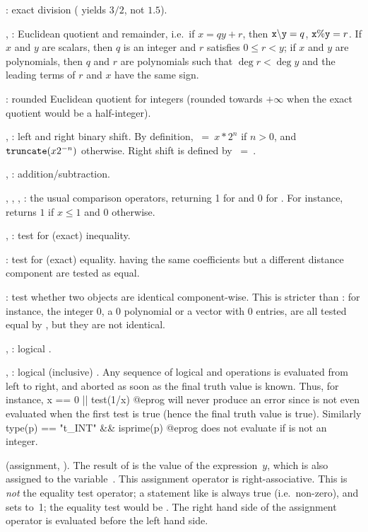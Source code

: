 \kbd{/}: exact division ( yields $3/2$, not $1.5$).

\kbd{\bs}, \kbd{\%}: Euclidean quotient and remainder, i.e.~if $x =
qy + r$, then $\kbd{x \b{ } y} = q$, ${\tt x\%y} = r$. If $x$ and $y$
are scalars, then $q$ is an integer and $r$ satisfies $0\le r < y$; if $x$ and $y$
are polynomials, then $q$ and $r$ are polynomials such that $\deg r< \deg y$ and
the leading terms of $r$ and $x$ have the same sign.

\kbd{\bs/}: rounded Euclidean quotient for integers (rounded towards
$+\infty$ when the exact quotient would be a half-integer).

\kbd{<<}, \kbd{>>}: left and right binary shift. By definition,
$~=~x * 2^n$ if $n>0$, and ${\tt truncate}(x 2^{-n})$ otherwise.
Right shift is defined by $~=~$.

%
\kbd{+}, \kbd{-}: addition/subtraction.

%
\kbd{<}, \kbd{>}, \kbd{<=}, \kbd{>=}: the usual comparison operators,
returning 1 for  and 0 for . For instance,
 returns $1$ if $x\le 1$ and $0$ otherwise.

\kbd{<>}, \kbd{!=}: test for (exact) inequality.

\kbd{==}: test for (exact) equality.  having the same coefficients
but a different distance component are tested as equal.

\kbd{===}: test whether two objects are identical component-wise. This is
stricter than \kbd{==} : for instance, the integer 0, a 0 polynomial or a
vector with 0 entries, are all tested equal by \kbd{==}, but they are not
identical.

%
\kbd{\&}, \kbd{\&\&}: logical .

\kbd{|}, \kbd{||}: logical (inclusive) . Any sequence of logical
 and  operations is evaluated from left to right,
and aborted as soon as the final truth value is known. Thus, for instance,
\bprog
  x == 0 || test(1/x)
@eprog\noindent
will never produce an error since  is not even evaluated
when the first test is true (hence the final truth value is true). Similarly
\bprog
  type(p) == "t_INT" && isprime(p)
@eprog\noindent
does not evaluate  if  is not an integer.

%
\kbd{=} (assignment,  \kbd{=} ). The result of
 is the value of the expression~$y$, which is also assigned to
the variable~. This assignment operator is right-associative. This is
\emph{not} the equality test operator; a statement like  is always
true (i.e.~non-zero), and sets  to~1; the equality test would be
. The right hand side of the assignment operator is evaluated
before the left hand side.


